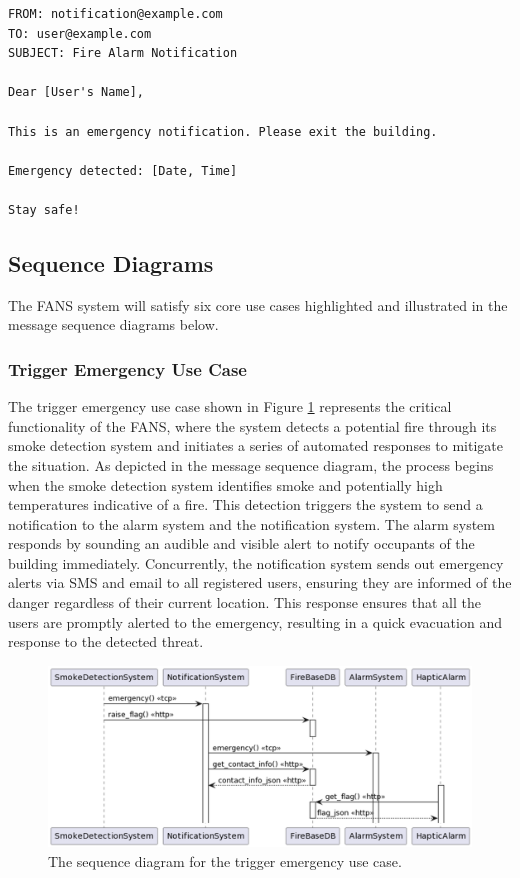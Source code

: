 {
\tiny
\begin{lstlisting}[label={lst:email},caption={Email notification for detected emergency in FANS.}]
FROM: notification@example.com
TO: user@example.com
SUBJECT: Fire Alarm Notification

Dear [User's Name],

This is an emergency notification. Please exit the building.

Emergency detected: [Date, Time]

Stay safe!
\end{lstlisting}
}

\subsection{Sequence Diagrams}

The FANS system will satisfy six core use cases highlighted and illustrated in the message sequence diagrams below.

\subsubsection{Trigger Emergency Use Case}

The trigger emergency use case shown in Figure \ref{fig:trigger-emerg} represents the critical functionality of the
FANS, where the system detects a potential fire through its smoke detection system and initiates a series of automated
responses to mitigate the situation. As depicted in the message sequence diagram, the process begins when the smoke
detection system identifies smoke and potentially high temperatures indicative of a fire. This detection triggers the
system to send a notification to the alarm system and the notification system. The alarm system responds by sounding an
audible and visible alert to notify occupants of the building immediately. Concurrently, the notification system sends
out emergency alerts via SMS and email to all registered users, ensuring they are informed of the danger regardless of
their current location. This response ensures that all the users are promptly alerted to the emergency, resulting in a
quick evacuation and response to the detected threat.

\begin{figure}
    \centering
    \includegraphics[width=\imagewidth]{../assets/sequence/TriggerEmergencyUseCaseSequenceDiagram.png}
    \caption{The sequence diagram for the trigger emergency use case.}
    \label{fig:trigger-emerg}
\end{figure}

